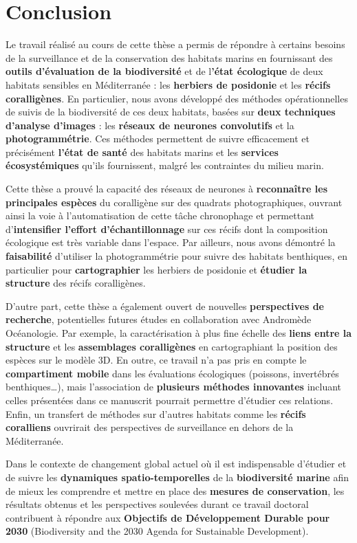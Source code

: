 \newpage

\section{Conclusion}\label{discussion.4}

Le travail réalisé au cours de cette thèse a permis de répondre à certains besoins de la surveillance et de la conservation des habitats marins en fournissant des \textbf{outils d’évaluation de la biodiversité} et de l\textbf{’état écologique} de deux habitats sensibles en Méditerranée : les \textbf{herbiers de posidonie} et les\textbf{ récifs coralligènes}. En particulier, nous avons développé des méthodes opérationnelles de suivis de la biodiversité de ces deux habitats, basées sur \textbf{deux techniques d’analyse d’images} : les \textbf{réseaux de neurones convolutifs} et la \textbf{photogrammétrie}. Ces méthodes permettent de suivre efficacement et précisément \textbf{l’état de santé} des habitats marins et les \textbf{services écosystémiques} qu’ils fournissent, malgré les contraintes du milieu marin.

Cette thèse a prouvé la capacité des réseaux de neurones à \textbf{reconnaître les principales espèces} du coralligène sur des quadrats photographiques, ouvrant ainsi la voie à l’automatisation de cette tâche chronophage et permettant d’\textbf{intensifier l’effort d’échantillonnage} sur ces récifs dont la composition écologique est très variable dans l’espace. Par ailleurs, nous avons démontré la \textbf{faisabilité} d’utiliser la photogrammétrie pour suivre des habitats benthiques, en particulier pour \textbf{cartographier} les herbiers de posidonie et \textbf{étudier la structure} des récifs coralligènes.

D’autre part, cette thèse a également ouvert de nouvelles \textbf{perspectives de recherche}, potentielles futures études en collaboration avec Andromède Océanologie. Par exemple, la caractérisation à plus fine échelle des \textbf{liens entre la structure} et les \textbf{assemblages coralligènes} en cartographiant la position des espèces sur le modèle 3D. En outre, ce travail n’a pas pris en compte le \textbf{compartiment mobile} dans les évaluations écologiques (poissons, invertébrés benthiques…), mais l’association de \textbf{plusieurs méthodes innovantes} incluant celles présentées dans ce manuscrit pourrait permettre d’étudier ces relations. Enfin, un transfert de méthodes sur d’autres habitats comme les \textbf{récifs coralliens} ouvrirait des perspectives de surveillance en dehors de la Méditerranée.

Dans le contexte de changement global actuel où il est indispensable d’étudier et de suivre les \textbf{dynamiques spatio-temporelles} de la \textbf{biodiversité marine} afin de mieux les comprendre et mettre en place des \textbf{mesures de conservation}, les résultats obtenus et les perspectives soulevées durant ce travail doctoral contribuent à répondre aux \textbf{Objectifs de Développement Durable pour 2030} (Biodiversity and the 2030 Agenda for Sustainable Development). 